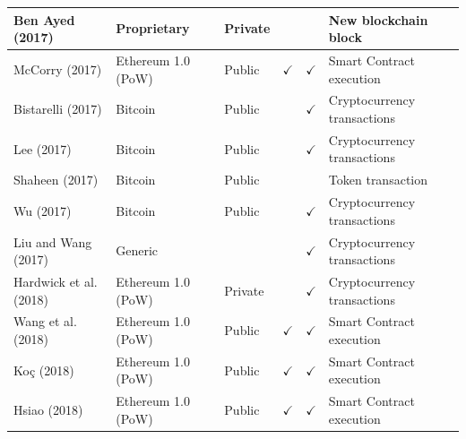 \documentclass[../access.tex]{subfiles}
\begin{document}
\begin{table}[htbp]
\begin{adjustwidth}{-2cm}{}
\begin{tabular}{m{4.4cm} >{\centering\arraybackslash}m{2.9cm} >{\centering\arraybackslash}m{1.0cm} >{\centering\arraybackslash}m{1.0cm} >{\centering\arraybackslash}m{1.5cm} >{\centering\arraybackslash}m{3.6cm}}
                    \footnotesize{Ben Ayed (2017) \cite{BenAyed2017}} & \footnotesize{Proprietary} & \footnotesize{Private} & {} & {} & \footnotesize{New blockchain block} \\
                    \hline
                    \footnotesize{McCorry (2017) \cite{McCorry2017}} & \footnotesize{Ethereum 1.0 (PoW)} & \footnotesize{Public} & $ \checkmark $ & $ \checkmark $ & \footnotesize{Smart Contract execution} \\
                    \hline
                    \footnotesize{Bistarelli (2017) \cite{Bistarelli2017}} & \footnotesize{Bitcoin} & \footnotesize{Public} & {} & $ \checkmark $ & \footnotesize{Cryptocurrency transactions} \\
                    \hline
                    \footnotesize{Lee (2017) \cite{Lee2017}} & \footnotesize{Bitcoin} & \footnotesize{Public} & {} & $ \checkmark $ & \footnotesize{Cryptocurrency transactions} \\
                    \hline
                    \footnotesize{Shaheen (2017) \cite{Shaheen2017}} & \footnotesize{Bitcoin} & \footnotesize{Public} & {} & {} & \footnotesize{Token transaction} \\
                    \hline
                    \footnotesize{Wu (2017) \cite{Wu2017}} & \footnotesize{Bitcoin} & \footnotesize{Public} & {} & $ \checkmark $ & \footnotesize{Cryptocurrency transactions} \\
                    \hline
                    \footnotesize{Liu and Wang (2017) \cite{Liu2017}} & \footnotesize{Generic} & {} & {} & $ \checkmark $ & \footnotesize{Cryptocurrency transactions} \\
                    \hline
                    \footnotesize{Hardwick et al. (2018) \cite{Hardwick2018}} & \footnotesize{Ethereum 1.0 (PoW)} & \footnotesize{Private} & {} & $ \checkmark $ & \footnotesize{Cryptocurrency transactions} \\
                    \hline
                    \footnotesize{Wang et al. (2018) \cite{Wang2018}} & \footnotesize{Ethereum 1.0 (PoW)} & \footnotesize{Public} & $ \checkmark $ & $ \checkmark $ & \footnotesize{Smart Contract execution} \\
                    \hline
                    \footnotesize{Ko\c{c} (2018) \cite{Koc2018}} & \footnotesize{Ethereum 1.0 (PoW)} & \footnotesize{Public} & $ \checkmark $ & $ \checkmark $ & \footnotesize{Smart Contract execution} \\
                    \hline
                    \footnotesize{Hsiao (2018) \cite{Hsiao2018}} & \footnotesize{Ethereum 1.0 (PoW)} & \footnotesize{Public} & $ \checkmark $ & $ \checkmark $ & \footnotesize{Smart Contract execution} \\

\end{tabular}
\end{adjustwidth}
\end{table}
\end{document}
